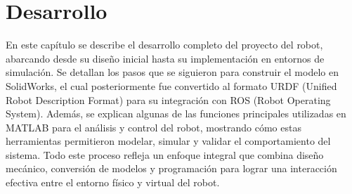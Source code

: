 \chapter{Desarrollo} \label{chap:desarrollo}
En este capítulo se describe el desarrollo completo del proyecto del robot, abarcando desde su diseño inicial hasta su implementación en entornos de simulación. Se detallan los pasos que se siguieron para construir el modelo en SolidWorks, el cual posteriormente fue convertido al formato URDF (Unified Robot Description Format) para su integración con ROS (Robot Operating System). Además, se explican algunas de las funciones principales utilizadas en MATLAB para el análisis y control del robot, mostrando cómo estas herramientas permitieron modelar, simular y validar el comportamiento del sistema. Todo este proceso refleja un enfoque integral que combina diseño mecánico, conversión de modelos y programación para lograr una interacción efectiva entre el entorno físico y virtual del robot.